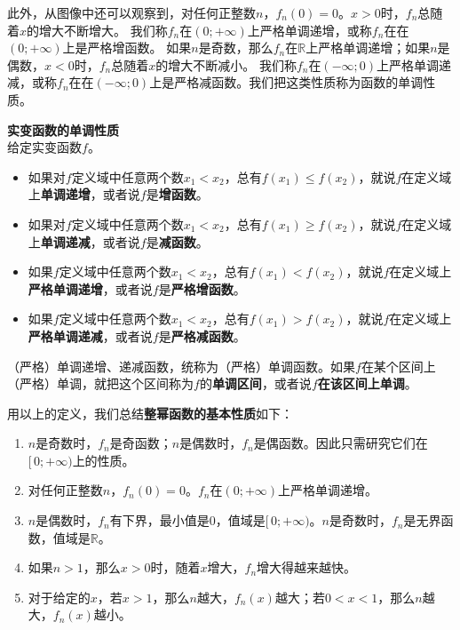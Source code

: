 \documentclass[12pt,UTF8]{ctexbook}
\begin{document}
此外，从图像中还可以观察到，对任何正整数$n$，$f_n(0) = 0$。$x>0$时，$f_n$总随着$x$的增大不断增大。
我们称$f_n$在$(0; +\infty)$上严格单调递增，或称$f_n$在在$(0; +\infty)$上是严格增函数。
如果$n$是奇数，那么$f_n$在$\mathbb{R}$上严格单调递增；如果$n$是偶数，$x<0$时，$f_n$总随着$x$的增大不断减小。
我们称$f_n$在$(-\infty; 0)$上严格单调递减，或称$f_n$在在$(-\infty; 0)$上是严格减函数。我们把这类性质称为函数的单调性质。
\begin{df}\textbf{实变函数的单调性质}\\
    给定实变函数$f$。
    \begin{itemize}
        \item 如果对$f$定义域中任意两个数$x_1 < x_2$，总有$f(x_1) \leqslant f(x_2)$，就说$f$在定义域上\textbf{单调递增}，或者说$f$是\textbf{增函数}。
        \item 如果对$f$定义域中任意两个数$x_1 < x_2$，总有$f(x_1) \geqslant f(x_2)$，就说$f$在定义域上\textbf{单调递减}，或者说$f$是\textbf{减函数}。
        \item 如果$f$定义域中任意两个数$x_1 < x_2$，总有$f(x_1) < f(x_2)$，就说$f$在定义域上\textbf{严格单调递增}，或者说$f$是\textbf{严格增函数}。
        \item 如果$f$定义域中任意两个数$x_1 < x_2$，总有$f(x_1) > f(x_2)$，就说$f$在定义域上\textbf{严格单调递减}，或者说$f$是\textbf{严格减函数}。   
    \end{itemize}
\end{df}

（严格）单调递增、递减函数，统称为（严格）单调函数。如果$f$在某个区间上（严格）单调，就把这个区间称为$f$的\textbf{单调区间}，或者说$f$\textbf{在该区间上单调}。

用以上的定义，我们总结\textbf{整幂函数的基本性质}如下：
\begin{enumerate}
    \item $n$是奇数时，$f_n$是奇函数；$n$是偶数时，$f_n$是偶函数。因此只需研究它们在$[\,0; +\infty)$上的性质。
    \item 对任何正整数$n$，$f_n(0) = 0$。$f_n$在$(0; +\infty)$上严格单调递增。
    \item $n$是偶数时，$f_n$有下界，最小值是$0$，值域是$[\,0; +\infty)$。$n$是奇数时，$f_n$是无界函数，值域是$\mathbb{R}$。
    \item 如果$n>1$，那么$x>0$时，随着$x$增大，$f_n$增大得越来越快。
    \item 对于给定的$x$，若$x>1$，那么$n$越大，$f_n(x)$越大；若$0 < x<1$，那么$n$越大，$f_n(x)$越小。
\end{enumerate}
\end{document}

